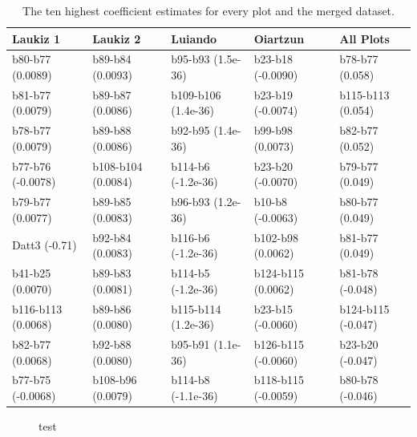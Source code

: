 \documentclass[review]{elsarticle}
\begin{document}
\begin{table}[b!]
\centering
\caption[t]{The ten highest coefficient estimates for every plot and the merged dataset.}
\begingroup\footnotesize
\begin{tabular}{lllll}
	\\
	Laukiz 1           & Laukiz 2           & Luiando             & Oiartzun            & All Plots          \\
	\hline
	b80-b77 (0.0089)   & b89-b84 (0.0093)   & b95-b93 (1.5e-36)   & b23-b18 (-0.0090)   & b78-b77 (0.058)    \\
	b81-b77 (0.0079)   & b89-b87 (0.0086)   & b109-b106 (1.4e-36) & b23-b19 (-0.0074)   & b115-b113 (0.054)  \\
	b78-b77 (0.0079)   & b89-b88 (0.0086)   & b92-b95 (1.4e-36)   & b99-b98 (0.0073)    & b82-b77 (0.052)    \\
	b77-b76 (-0.0078)  & b108-b104 (0.0084) & b114-b6 (-1.2e-36)  & b23-b20 (-0.0070)   & b79-b77 (0.049)    \\
	b79-b77 (0.0077)   & b89-b85 (0.0083)   & b96-b93 (1.2e-36)   & b10-b8 (-0.0063)    & b80-b77 (0.049)    \\
	Datt3 (-0.71)      & b92-b84 (0.0083)   & b116-b6 (-1.2e-36)  & b102-b98 (0.0062)   & b81-b77 (0.049)    \\
	b41-b25 (0.0070)   & b89-b83 (0.0081)   & b114-b5 (-1.2e-36)  & b124-b115 (0.0062)  & b81-b78 (-0.048)   \\
	b116-b113 (0.0068) & b89-b86 (0.0080)   & b115-b114 (1.2e-36) & b23-b15 (-0.0060)   & b124-b115 (-0.047) \\
	b82-b77 (0.0068)   & b92-b88 (0.0080)   & b95-b91 (1.1e-36)   & b126-b115 (-0.0060) & b23-b20 (-0.047)   \\
	b77-b75 (-0.0068)  & b108-b96 (0.0079)  & b114-b8 (-1.1e-36)  & b118-b115 (-0.0059) & b80-b78 (-0.046)   \\
	\bottomrule
\end{tabular}
\endgroup
\label{tab:variable-importance}
\end{table}

\begin{figure} [b!]
	\begin{center}
		\caption{test}
		\label{fig:important-bands}
	\end{center}
\end{figure}
\end{document}

